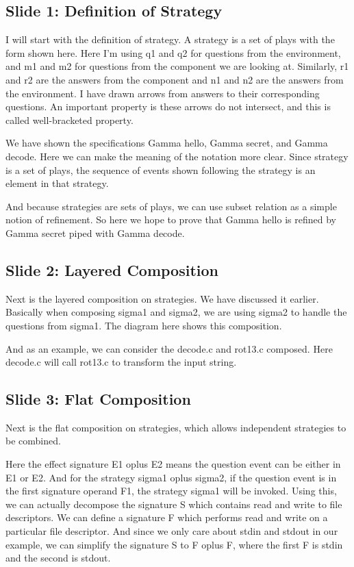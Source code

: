 \documentclass{article}
\begin{document}
\subsection{Slide 1: Definition of Strategy}

I will start with the definition of strategy. A strategy is a set of plays with
the form shown here. Here I'm using q1 and q2 for questions from the
environment, and m1 and m2 for questions from the component we are looking at.
Similarly, r1 and r2 are the answers from the component and n1 and n2 are the
answers from the environment. I have drawn arrows from answers to their
corresponding questions. An important property is these arrows do not intersect,
and this is called well-bracketed property.

We have shown the specifications Gamma hello, Gamma secret, and Gamma decode.
Here we can make the meaning of the notation more clear. Since strategy is a set
of plays, the sequence of events shown following the strategy is an element in
that strategy.

And because strategies are sets of plays, we can use subset relation as a simple
notion of refinement. So here we hope to prove that Gamma hello is refined by
Gamma secret piped with Gamma decode.

\subsection{Slide 2: Layered Composition}

Next is the layered composition on strategies. We have discussed it earlier.
Basically when composing sigma1 and sigma2, we are using sigma2 to handle the
questions from sigma1. The diagram here shows this composition.

And as an example, we can consider the decode.c and rot13.c composed. Here
decode.c will call rot13.c to transform the input string.

\subsection{Slide 3: Flat Composition}

Next is the flat composition on strategies, which allows independent strategies
to be combined.

Here the effect signature E1 oplus E2 means the question event can be either in
E1 or E2. And for the strategy sigma1 oplus sigma2, if the question event is in
the first signature operand F1, the strategy sigma1 will be invoked. Using this,
we can actually decompose the signature S which contains read and write to file
descriptors. We can define a signature F which performs read and write on a
particular file descriptor. And since we only care about stdin and stdout in our
example, we can simplify the signature S to F oplus F, where the first F is
stdin and the second is stdout.
\end{document}

